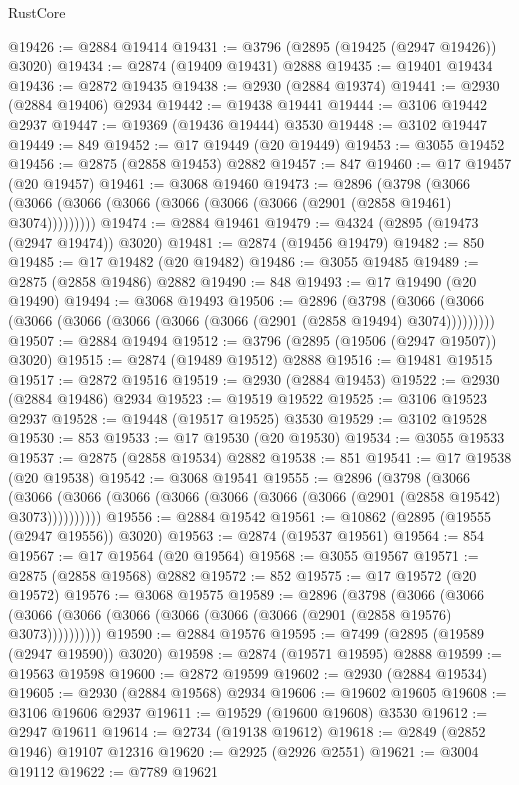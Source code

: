 \begin{lexlean}{RustCore}
\begin{coremodule}
@19426 := @2884 @19414
@19431 := @3796 (@2895 (@19425 (@2947 @19426)) @3020)
@19434 := @2874 (@19409 @19431) @2888
@19435 := @19401 @19434
@19436 := @2872 @19435
@19438 := @2930 (@2884 @19374)
@19441 := @2930 (@2884 @19406) @2934
@19442 := @19438 @19441
@19444 := @3106 @19442 @2937
@19447 := @19369 (@19436 @19444) @3530
@19448 := @3102 @19447
@19449 := 849
@19452 := @17 @19449 (@20 @19449)
@19453 := @3055 @19452
@19456 := @2875 (@2858 @19453) @2882
@19457 := 847
@19460 := @17 @19457 (@20 @19457)
@19461 := @3068 @19460
@19473 := @2896
    (@3798 (@3066 (@3066 (@3066 (@3066 (@3066 (@3066 (@3066 (@2901 (@2858 @19461) @3074)))))))))
@19474 := @2884 @19461
@19479 := @4324 (@2895 (@19473 (@2947 @19474)) @3020)
@19481 := @2874 (@19456 @19479)
@19482 := 850
@19485 := @17 @19482 (@20 @19482)
@19486 := @3055 @19485
@19489 := @2875 (@2858 @19486) @2882
@19490 := 848
@19493 := @17 @19490 (@20 @19490)
@19494 := @3068 @19493
@19506 := @2896
    (@3798 (@3066 (@3066 (@3066 (@3066 (@3066 (@3066 (@3066 (@2901 (@2858 @19494) @3074)))))))))
@19507 := @2884 @19494
@19512 := @3796 (@2895 (@19506 (@2947 @19507)) @3020)
@19515 := @2874 (@19489 @19512) @2888
@19516 := @19481 @19515
@19517 := @2872 @19516
@19519 := @2930 (@2884 @19453)
@19522 := @2930 (@2884 @19486) @2934
@19523 := @19519 @19522
@19525 := @3106 @19523 @2937
@19528 := @19448 (@19517 @19525) @3530
@19529 := @3102 @19528
@19530 := 853
@19533 := @17 @19530 (@20 @19530)
@19534 := @3055 @19533
@19537 := @2875 (@2858 @19534) @2882
@19538 := 851
@19541 := @17 @19538 (@20 @19538)
@19542 := @3068 @19541
@19555 := @2896
    (@3798
      (@3066 (@3066 (@3066 (@3066 (@3066 (@3066 (@3066 (@3066 (@2901 (@2858 @19542) @3073))))))))))
@19556 := @2884 @19542
@19561 := @10862 (@2895 (@19555 (@2947 @19556)) @3020)
@19563 := @2874 (@19537 @19561)
@19564 := 854
@19567 := @17 @19564 (@20 @19564)
@19568 := @3055 @19567
@19571 := @2875 (@2858 @19568) @2882
@19572 := 852
@19575 := @17 @19572 (@20 @19572)
@19576 := @3068 @19575
@19589 := @2896
    (@3798
      (@3066 (@3066 (@3066 (@3066 (@3066 (@3066 (@3066 (@3066 (@2901 (@2858 @19576) @3073))))))))))
@19590 := @2884 @19576
@19595 := @7499 (@2895 (@19589 (@2947 @19590)) @3020)
@19598 := @2874 (@19571 @19595) @2888
@19599 := @19563 @19598
@19600 := @2872 @19599
@19602 := @2930 (@2884 @19534)
@19605 := @2930 (@2884 @19568) @2934
@19606 := @19602 @19605
@19608 := @3106 @19606 @2937
@19611 := @19529 (@19600 @19608) @3530
@19612 := @2947 @19611
@19614 := @2734 (@19138 @19612)
@19618 := @2849 (@2852 @1946) @19107 @12316
@19620 := @2925 (@2926 @2551)
@19621 := @3004 @19112
@19622 := @7789 @19621

\end{coremodule}
\end{lexlean}
